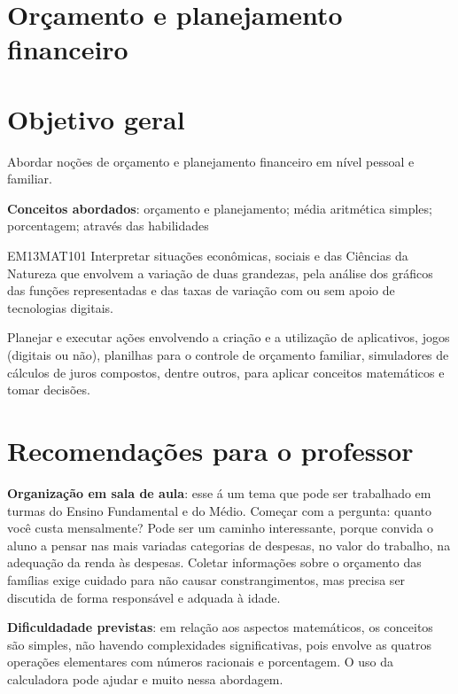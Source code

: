 \begin{paginatexto2}
\section*{Orçamento e planejamento financeiro}

\section*{Objetivo geral}

Abordar noções de orçamento e planejamento financeiro em nível pessoal e familiar.

\textbf{Conceitos abordados}: orçamento e planejamento; média aritmética simples; porcentagem; através das habilidades

\begin{objetivos}{EM13MAT101}
 Interpretar situações econômicas, sociais e das Ciências da Natureza
que envolvem a variação de duas grandezas, pela análise dos gráficos das funções representadas e das taxas de variação com ou sem apoio de tecnologias digitais.

Planejar e executar ações envolvendo a criação e a utilização de aplicativos, jogos (digitais ou não), planilhas para o controle de orçamento familiar, simuladores de cálculos de juros compostos, dentre outros, para aplicar conceitos matemáticos e tomar decisões. 

\end{objetivos}

\section*{Recomendações para o professor}

\textbf{Organização em sala de aula}: esse á um tema que pode ser trabalhado em turmas do Ensino Fundamental e do Médio. Começar com a pergunta: quanto você custa mensalmente? Pode ser um caminho interessante, porque convida o aluno a pensar nas mais variadas categorias de despesas, no valor do trabalho, na adequação da renda às despesas. Coletar informações sobre o orçamento das famílias exige cuidado para não causar constrangimentos, mas precisa ser discutida de forma responsável e adquada à idade.

\textbf{Dificuldadade previstas}: em relação aos aspectos matemáticos, os conceitos são simples, não havendo complexidades significativas, pois envolve as quatros operações elementares com números racionais e porcentagem. O uso da calculadora pode ajudar e muito nessa abordagem.


\end{paginatexto2}
